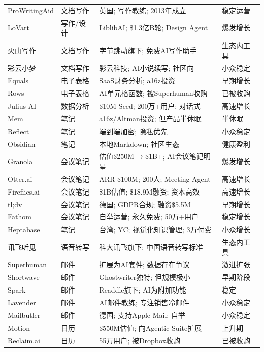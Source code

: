 \begin{keybox}[本章60+家公司状态速查表（截至2026年3月）]
\begin{tabularx}{\textwidth}{l l X l}
ProWritingAid  & 文档写作 & 英国; 写作教练; 2013年成立 & 稳定运营 \\
LoVart         & 写作/设计 & LiblibAI; \$1.3亿B轮; Design Agent & 爆发增长 \\
火山写作        & 文档写作 & 字节跳动旗下; 免费AI写作助手 & 生态内工具 \\
彩云小梦        & 文档写作 & 彩云科技; AI小说续写; 社区向 & 小众稳定 \\
\midrule
Equals         & 电子表格 & SaaS财务分析; a16z投资 & 早期增长 \\
Rows           & 电子表格 & AI单元格函数; 被Superhuman收购 & 已被收购 \\
Julius AI      & 数据分析 & \$10M Seed; 200万+用户; 对话式 & 高速增长 \\
\midrule
Mem            & 笔记 & a16z/Altman投资; 但产品半休眠 & 半休眠 \\
Reflect        & 笔记 & 端到端加密; 隐私优先 & 小众稳定 \\
Obsidian       & 笔记 & 本地Markdown; 社区生态 & 健康盈利 \\
Granola        & 会议笔记 & 估值\$250M$\to$\$1B+; AI会议笔记明星 & 爆发增长 \\
Otter.ai       & 会议笔记 & ARR \$100M; 200人; Meeting Agent & 高速增长 \\
Fireflies.ai   & 会议笔记 & \$1B估值; \$18.9M融资; 资本高效 & 高速增长 \\
tl;dv          & 会议笔记 & 德国; GDPR合规; 融资\$5.5M & 早期增长 \\
Fathom         & 会议笔记 & 自举运营; 永久免费; 50万+用户 & 稳定增长 \\
Heptabase      & 笔记 & 台湾; YC; 视觉化知识管理; 3万付费 & 小众增长 \\
讯飞听见        & 语音转写 & 科大讯飞旗下; 中国语音转写标准 & 生态内工具 \\
\midrule
Superhuman     & 邮件 & 扩展为AI套件; 数据存在争议 & 激进扩张 \\
Shortwave      & 邮件 & Ghostwriter独特; 但规模极小 & 早期阶段 \\
Spark          & 邮件 & Readdle旗下; AI为附加功能 & 稳定 \\
Lavender       & 邮件 & AI邮件教练; 专注销售冷邮件 & 小众稳定 \\
Mailbutler     & 邮件 & 德国; 支持Apple Mail; 自举 & 小众稳定 \\
\midrule
Motion         & 日历 & \$550M估值; 向Agentic Suite扩展 & 上升期 \\
Reclaim.ai     & 日历 & 55万用户; 被Dropbox收购 & 已被收购 \\

\end{tabularx}
\end{keybox}
